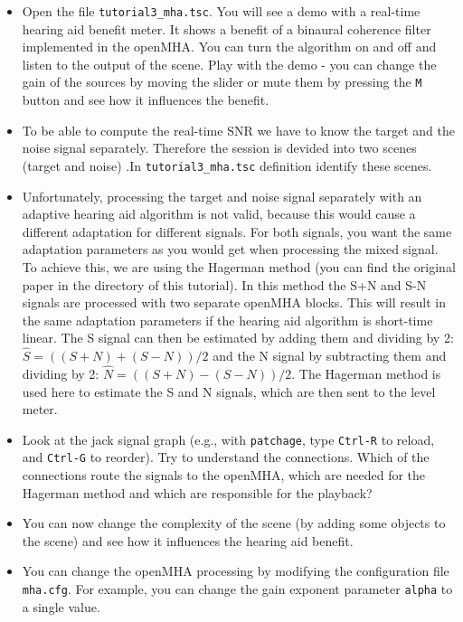 \documentclass[11pt,a4paper,twoside]{article}
\begin{document}
\begin{itemize}
\item Open the file \verb!tutorial3_mha.tsc!. You will see a demo with a real-time hearing aid benefit meter. It shows a benefit of a binaural coherence filter implemented in the openMHA. You can turn the algorithm on and off and listen to the output of the \tascar{} scene. Play with the demo - you can change the gain of the sources by moving the slider or mute them by pressing the \verb!M! button and see how it influences the benefit. 
\item To be able to compute the real-time SNR we have to know the target and the noise signal separately. 
Therefore the \tascar{} session is devided into two scenes (target and noise) .In \verb!tutorial3_mha.tsc! definition identify these scenes. 
\item Unfortunately, processing the target and noise signal separately with an adaptive hearing aid algorithm is not valid, because this would cause a different adaptation for different signals.
For both signals, you want the same adaptation parameters as you would get when processing the mixed signal. To achieve this, we are using the Hagerman method (you can find the original paper in the directory of this tutorial). 
In this method the S+N and S-N signals are processed with two separate openMHA blocks. This will result in the same adaptation parameters if the hearing aid algorithm is short-time linear. 
The S signal can then be estimated by adding them and dividing by 2: $\hat{S} = ((S+N)+(S-N))/2$ and the N signal by subtracting them and dividing by 2: $\hat{N} = ((S+N)-(S-N))/2$.
The Hagerman method is used here to estimate the S and N signals, which are then sent to the level meter.
\item Look at the jack signal graph (e.g., with \verb!patchage!, type
 \verb!Ctrl-R! to reload, and \verb!Ctrl-G! to reorder). Try to understand the connections.  Which of the connections route the signals to the openMHA, which are needed for the Hagerman method and which are responsible for the playback?
\item You can now change the complexity of the scene (by adding some objects to the scene) and see how it influences the  hearing aid benefit. 
\item You can change the openMHA processing by modifying the configuration file \verb!mha.cfg!. For example, you can change the gain exponent parameter \verb!alpha! to a single value. 
\end{itemize}

\fi
\end{document}
